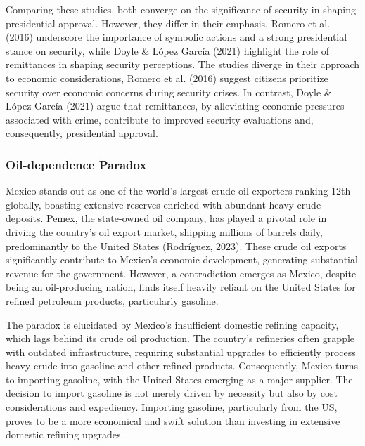 \documentclass[
]{article}
\begin{document}
Comparing these studies, both converge on the significance of security
in shaping presidential approval. However, they differ in their
emphasis, Romero et al. (2016) underscore the importance of symbolic
actions and a strong presidential stance on security, while Doyle \&
López García (2021) highlight the role of remittances in shaping
security perceptions. The studies diverge in their approach to economic
considerations, Romero et al. (2016) suggest citizens prioritize
security over economic concerns during security crises. In contrast,
Doyle \& López García (2021) argue that remittances, by alleviating
economic pressures associated with crime, contribute to improved
security evaluations and, consequently, presidential approval.

\hypertarget{oil-dependence-paradox}{%
\subsubsection{Oil-dependence Paradox}\label{oil-dependence-paradox}}

Mexico stands out as one of the world's largest crude oil exporters
ranking 12th globally, boasting extensive reserves enriched with
abundant heavy crude deposits. Pemex, the state-owned oil company, has
played a pivotal role in driving the country's oil export market,
shipping millions of barrels daily, predominantly to the United States
(Rodríguez, 2023). These crude oil exports significantly contribute to
Mexico's economic development, generating substantial revenue for the
government. However, a contradiction emerges as Mexico, despite being an
oil-producing nation, finds itself heavily reliant on the United States
for refined petroleum products, particularly gasoline.

The paradox is elucidated by Mexico's insufficient domestic refining
capacity, which lags behind its crude oil production. The country's
refineries often grapple with outdated infrastructure, requiring
substantial upgrades to efficiently process heavy crude into gasoline
and other refined products. Consequently, Mexico turns to importing
gasoline, with the United States emerging as a major supplier. The
decision to import gasoline is not merely driven by necessity but also
by cost considerations and expediency. Importing gasoline, particularly
from the US, proves to be a more economical and swift solution than
investing in extensive domestic refining upgrades.
\end{document}
